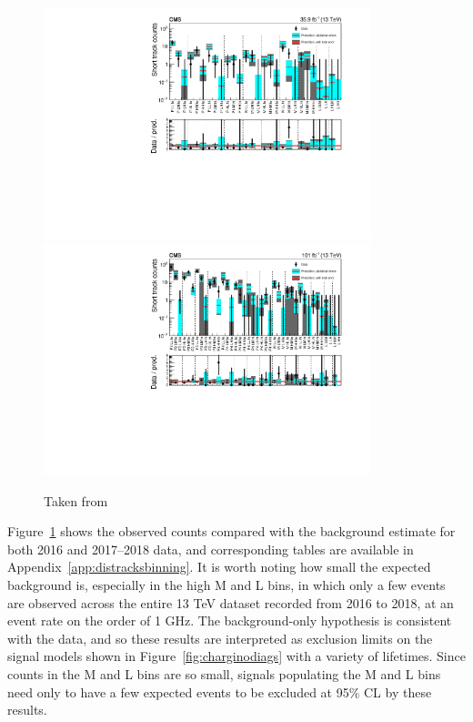   \begin{figure}[h!]
    \centering
    \includegraphics[width=0.85\textwidth]{figures/MT2_2019/Figure_006-a.pdf}
    \includegraphics[width=0.85\textwidth]{figures/MT2_2019/Figure_006-b.pdf}
    \caption[Comparison of the predicted background and observed data events in the disappearing track search for (upper) 2016 and (lower) 2017--2018.]{Taken from \cite{MT2_2019}}
    \label{fig:distracksresults}
  \end{figure}  

  Figure~\ref{fig:distracksresults} shows the observed counts compared with the background estimate for both 2016 and 2017--2018 data, and corresponding tables are available in Appendix~\ref{app:distracksbinning}.
  It is worth noting how small the expected background is, especially in the high \pt M and L bins, in which only a few events are observed across the entire 13 TeV dataset recorded from 2016 to 2018, at an event rate on the order of 1 GHz.
  The background-only hypothesis is consistent with the data, and so these results are interpreted as exclusion limits on the signal models shown in Figure~\ref{fig:charginodiags} with a variety of lifetimes.
  Since counts in the M and L bins are so small, signals populating the M and L bins need only to have a few expected events to be excluded at 95\% CL by these results.



